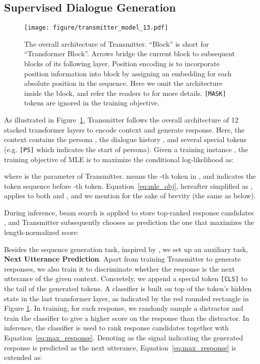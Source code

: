 \documentclass[11pt,a4paper]{article}
\begin{document}
\subsection{Supervised Dialogue Generation}\label{sec:supervised}

\begin{figure}[t]
    \centering
    \texttt{[image: figure/transmitter\_model\_13.pdf]}
    \caption{The overall architecture of Transmitter. ``Block'' is short for ``Transformer Block''. Arrows \scalebox{0.8}{} bridge the current block to subsequent blocks of its following layer. Position encoding is to incorporate position information into block by assigning an embedding for each absolute position in the sequence. Here we omit the architecture inside the block, and refer the readers to \citet{vaswani2017attention} for more details. \texttt{[MASK]} tokens are ignored in the training objective.}
    \label{fig:transmitter_model}
\end{figure}

As illustrated in Figure~\ref{fig:transmitter_model}, Transmitter follows the overall architecture of 12 stacked transformer layers to encode context and generate response. Here, the context contains the persona , the dialogue history , and several special tokens (e.g. \texttt{[PS]} which indicates the start of persona). Given a training instance , the training objective of MLE is to maximize the conditional log-likelihood as:

where  is the parameter of Transmitter.  means the -th token in , and  indicates the token sequence before -th token. Equation~\ref{eq:mle_obj}, hereafter simplified as , applies to both  and , and we mention  for the sake of brevity (the same as below).

During inference, beam search is applied to store top-ranked response candidates , and Transmitter subsequently chooses as prediction the one that maximizes the length-normalized score:


Besides the sequence generation task, inspired by \citet{wolf2019transfertransfo}, we set up an auxiliary task, \textbf{Next Utterance Prediction}. Apart from training Transmitter to generate responses, we also train it to discriminate whether the response is the next utterance of the given context. Concretely, we append a special token \texttt{[CLS]} to the tail of the generated tokens. A classifier is built on top of the token's hidden state in the last transformer layer, as indicated by the red rounded rectangle in Figure \ref{fig:transmitter_model}. In training, for each response, we randomly sample a distractor and train the classifier to give a higher score on the response than the distractor. In inference, the classifier is used to rank response candidates together with Equation~\ref{eq:max_response}. Denoting as  the signal indicating the generated response  is predicted as the next utterance, Equation~\ref{eq:max_response} is extended as:
\end{document}
